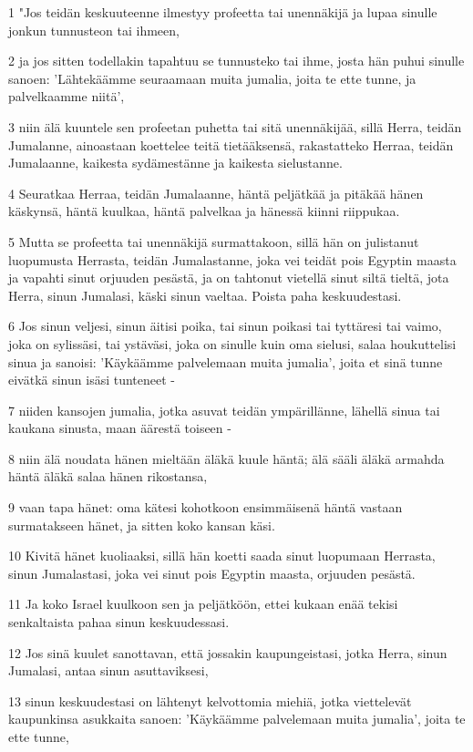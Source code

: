 \par 1 "Jos teidän keskuuteenne ilmestyy profeetta tai unennäkijä ja lupaa sinulle jonkun tunnusteon tai ihmeen,
\par 2 ja jos sitten todellakin tapahtuu se tunnusteko tai ihme, josta hän puhui sinulle sanoen: 'Lähtekäämme seuraamaan muita jumalia, joita te ette tunne, ja palvelkaamme niitä',
\par 3 niin älä kuuntele sen profeetan puhetta tai sitä unennäkijää, sillä Herra, teidän Jumalanne, ainoastaan koettelee teitä tietääksensä, rakastatteko Herraa, teidän Jumalaanne, kaikesta sydämestänne ja kaikesta sielustanne.
\par 4 Seuratkaa Herraa, teidän Jumalaanne, häntä peljätkää ja pitäkää hänen käskynsä, häntä kuulkaa, häntä palvelkaa ja hänessä kiinni riippukaa.
\par 5 Mutta se profeetta tai unennäkijä surmattakoon, sillä hän on julistanut luopumusta Herrasta, teidän Jumalastanne, joka vei teidät pois Egyptin maasta ja vapahti sinut orjuuden pesästä, ja on tahtonut vietellä sinut siltä tieltä, jota Herra, sinun Jumalasi, käski sinun vaeltaa. Poista paha keskuudestasi.
\par 6 Jos sinun veljesi, sinun äitisi poika, tai sinun poikasi tai tyttäresi tai vaimo, joka on sylissäsi, tai ystäväsi, joka on sinulle kuin oma sielusi, salaa houkuttelisi sinua ja sanoisi: 'Käykäämme palvelemaan muita jumalia', joita et sinä tunne eivätkä sinun isäsi tunteneet -
\par 7 niiden kansojen jumalia, jotka asuvat teidän ympärillänne, lähellä sinua tai kaukana sinusta, maan äärestä toiseen -
\par 8 niin älä noudata hänen mieltään äläkä kuule häntä; älä sääli äläkä armahda häntä äläkä salaa hänen rikostansa,
\par 9 vaan tapa hänet: oma kätesi kohotkoon ensimmäisenä häntä vastaan surmatakseen hänet, ja sitten koko kansan käsi.
\par 10 Kivitä hänet kuoliaaksi, sillä hän koetti saada sinut luopumaan Herrasta, sinun Jumalastasi, joka vei sinut pois Egyptin maasta, orjuuden pesästä.
\par 11 Ja koko Israel kuulkoon sen ja peljätköön, ettei kukaan enää tekisi senkaltaista pahaa sinun keskuudessasi.
\par 12 Jos sinä kuulet sanottavan, että jossakin kaupungeistasi, jotka Herra, sinun Jumalasi, antaa sinun asuttaviksesi,
\par 13 sinun keskuudestasi on lähtenyt kelvottomia miehiä, jotka viettelevät kaupunkinsa asukkaita sanoen: 'Käykäämme palvelemaan muita jumalia', joita te ette tunne,
